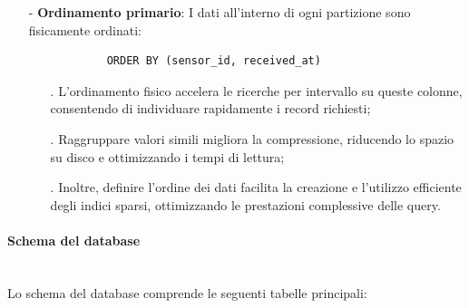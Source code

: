 \documentclass[10pt]{article}
\newcommand{\myparagraph}[1]{\paragraph{#1}\mbox{}\\}
\begin{document}
\begin{itemize}
            \item[-] \textbf{Ordinamento primario}: I dati all'interno di ogni partizione sono fisicamente ordinati:
            \begin{lstlisting}
            ORDER BY (sensor_id, received_at)
            \end{lstlisting}
            \begin{itemize}
                \item[.] L'ordinamento fisico accelera le ricerche per intervallo su queste colonne, consentendo di individuare rapidamente i record richiesti;
                \item[.] Raggruppare valori simili migliora la compressione, riducendo lo spazio su disco e ottimizzando i tempi di lettura;
                \item[.] Inoltre, definire l'ordine dei dati facilita la creazione e l'utilizzo efficiente degli indici sparsi, ottimizzando le prestazioni complessive delle query.
            \end{itemize}         
        \end{itemize}

        \myparagraph{Schema del database}
        Lo schema del database comprende le seguenti tabelle principali:
\end{document}
